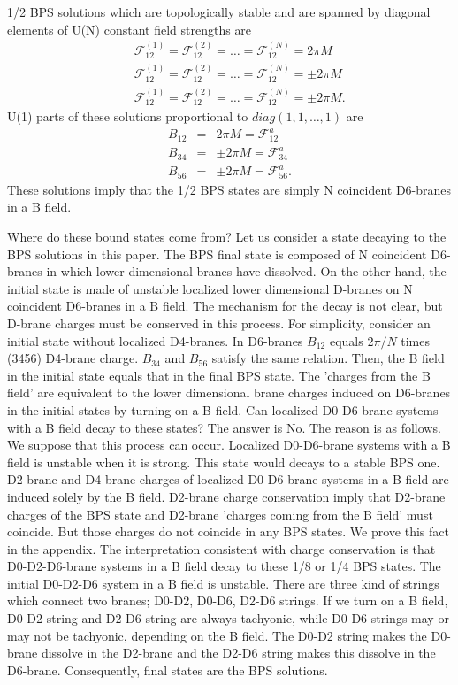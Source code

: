 \documentclass[a4paper,12pt]{article}
\begin{document}
1/2 BPS solutions which are topologically stable and are spanned by diagonal elements of U(N) constant field strengths are
\begin{eqnarray}
&& \mathcal{F}_{12}^{(1)}=\mathcal{F}_{12}^{(2)}= \ldots = \mathcal{F}_{12}^{(N)}=2 \pi M \nonumber \\
&& \mathcal{F}_{12}^{(1)}=\mathcal{F}_{12}^{(2)}= \ldots = \mathcal{F}_{12}^{(N)}= \pm 2 \pi M \nonumber \\
&& \mathcal{F}_{12}^{(1)}=\mathcal{F}_{12}^{(2)}= \ldots = \mathcal{F}_{12}^{(N)}= \pm 2 \pi M. \label{eq:1/2sol}
\end{eqnarray}
U(1) parts of these solutions proportional to $diag(1,1,\ldots,1)$ are
\begin{eqnarray*}
B_{12} &=& 2 \pi M =\mathcal{F}_{12}^a \\
B_{34} &=& \pm 2 \pi M = \mathcal{F}_{34}^a \\
B_{56} &=& \pm 2 \pi M = \mathcal{F}_{56}^a. 
\end{eqnarray*}
These solutions imply that the 1/2 BPS states are simply N coincident D6-branes in a B field. 

Where do these bound states come from? Let us consider a state decaying to the BPS solutions in this paper. The BPS final state is composed of N coincident D6-branes in which lower dimensional branes have dissolved. On the other hand, the initial state is made of unstable localized lower dimensional D-branes on N coincident D6-branes in a B field. The mechanism for the decay is not clear, but D-brane charges must be conserved in this process. For simplicity, consider an initial state without localized D4-branes. In D6-branes $B_{12}$ equals $2\pi /N$ times (3456) D4-brane charge. $B_{34}$ and $B_{56}$ satisfy the same relation. Then, the B field in the initial state equals that in the final BPS state. The 'charges from the B field' are equivalent to the lower dimensional brane charges induced on D6-branes in the initial states by turning on a B field. Can localized D0-D6-brane systems with a B field decay to these states? The answer is No. The reason is as follows. We suppose that this process can occur. Localized D0-D6-brane systems with a B field is unstable when it is strong. This state would decays to a stable BPS one. D2-brane and D4-brane charges of localized D0-D6-brane systems in a B field are induced solely by the B field. D2-brane charge conservation imply that D2-brane charges of the BPS state and D2-brane 'charges coming from the B field' must coincide. But those charges do not coincide in any BPS states. We prove this fact in the appendix. The interpretation consistent with charge conservation is that D0-D2-D6-brane systems in a B field decay to these 1/8 or 1/4 BPS states. The initial D0-D2-D6 system in a B field is unstable. There are three kind of strings which connect two branes; D0-D2, D0-D6, D2-D6 strings. If we turn on a B field,  D0-D2 string and D2-D6 string are always tachyonic, while D0-D6 strings may or may not be tachyonic, depending on the B field. The D0-D2 string makes the D0-brane dissolve in the D2-brane and the D2-D6 string makes this dissolve in the D6-brane. Consequently, final states are the BPS solutions.            
\end{document}
